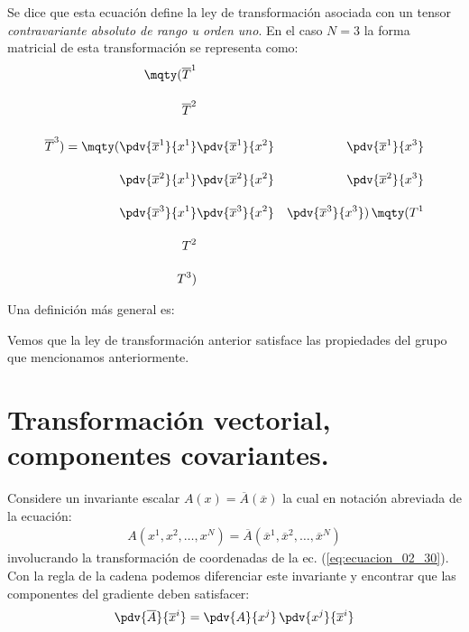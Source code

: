 Se dice que esta ecuación define la ley de transformación asociada con un tensor \emph{contravariante absoluto de rango u orden uno}. En el caso $N = 3$ la forma matricial de esta transformación se representa como:
\begin{align}
\mqty(
\overline{T}^{1} \\[1em]
\overline{T}^{2} \\[1em]
\overline{T}^{3}
) = \mqty(
\displaystyle \pdv{\overline{x}^{1}}{x^{1}} & \displaystyle \pdv{\overline{x}^{1}}{x^{2}} & \displaystyle \pdv{\overline{x}^{1}}{x^{3}} \\[1em]
\displaystyle \pdv{\overline{x}^{2}}{x^{1}} & \displaystyle \pdv{\overline{x}^{2}}{x^{2}} & \displaystyle \pdv{\overline{x}^{2}}{x^{3}} \\[1em]
\displaystyle \pdv{\overline{x}^{3}}{x^{1}} & \displaystyle \pdv{\overline{x}^{3}}{x^{2}} & \displaystyle \pdv{\overline{x}^{3}}{x^{3}}
) \, \mqty(
T^{1} \\[1em]
T^{2} \\[1em]
T^{3}
)
\label{eq:ecuacion_02_41}
\end{align}

Una definición más general es:
\begin{center}
    \noindent{}
\end{center}
\par
Vemos que la ley de transformación anterior satisface las propiedades del grupo que mencionamos anteriormente.

\section{Transformación vectorial, componentes covariantes.}

Considere un invariante escalar $A (x) = \overline{A} (\overline{x})$ la cual en notación abreviada de la ecuación:
\begin{align*}
A (x^{1}, x^{2}, \ldots, x^{N}) = \overline{A} (\overline{x}^{1}, \overline{x}^{2}, \ldots, \overline{x}^{N})
\end{align*}
involucrando la transformación de coordenadas de la ec. (\ref{eq:ecuacion_02_30}). Con la regla de la cadena podemos diferenciar este invariante y encontrar que las componentes del gradiente deben satisfacer:
\begin{align}
\pdv{\overline{A}}{\overline{x}^{i}} = \pdv{A}{x^{j}} \, \pdv{x^{j}}{\overline{x}^{i}}
\label{eq:ecuacion_02_46}
\end{align}

